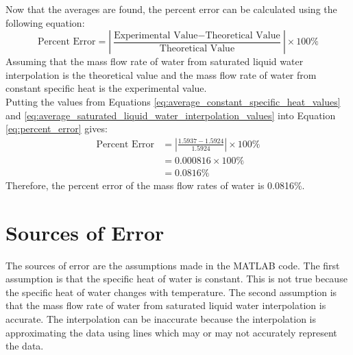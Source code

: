 \documentclass[12pt, titlepage]{article}
\begin{document}
Now that the averages are found, the percent error can be calculated using the
following equation:
\begin{equation}
  \text{Percent Error} = \left| \frac{\text{Experimental Value} - \text{Theoretical Value}}{\text{Theoretical Value}}\right| \times 100\%
  \label{eq:percent_error}
\end{equation}
Assuming that the mass flow rate of water from saturated liquid water interpolation
is the theoretical value and the mass flow rate of water from constant specific
heat is the experimental value.\\[10pt]
Putting the values from Equations
\ref{eq:average_constant_specific_heat_values} and
\ref{eq:average_saturated_liquid_water_interpolation_values} into Equation
\ref{eq:percent_error} gives:
\begin{align}
  \text{Percent Error} &= \left| \frac{1.5937 - 1.5924}{1.5924}\right| \times 100\% \nonumber \\
  &= 0.000816 \times 100\% \nonumber \\
  &= 0.0816\%
  \label{eq:percent_error_values}
\end{align}
Therefore, the percent error of the mass flow rates of water is 0.0816\%.
\section{Sources of Error}
The sources of error are the assumptions made in the MATLAB code. The first
assumption is that the specific heat of water is constant. This is not true
because the specific heat of water changes with temperature. The second assumption
is that the mass flow rate of water from saturated liquid water interpolation
is accurate. The interpolation can be inaccurate because the interpolation is
approximating the data using lines which may or may not accurately represent the
data.
\end{document}
